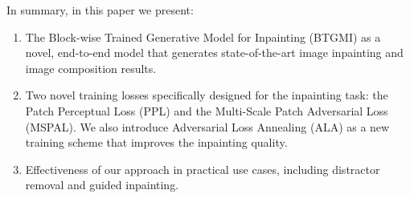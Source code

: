In summary, in this paper we present:
\begin{enumerate}
\item The Block-wise Trained Generative Model for Inpainting (BTGMI) as a novel, end-to-end model that generates state-of-the-art image inpainting and image composition results.  
\item Two novel training losses specifically designed for the inpainting task: the Patch Perceptual Loss (PPL) and the Multi-Scale Patch Adversarial Loss (MSPAL). We also introduce Adversarial Loss Annealing (ALA) as a new training scheme that improves the inpainting quality. 
\item Effectiveness of our approach in practical use cases, including distractor removal and guided inpainting. 
\end{enumerate}